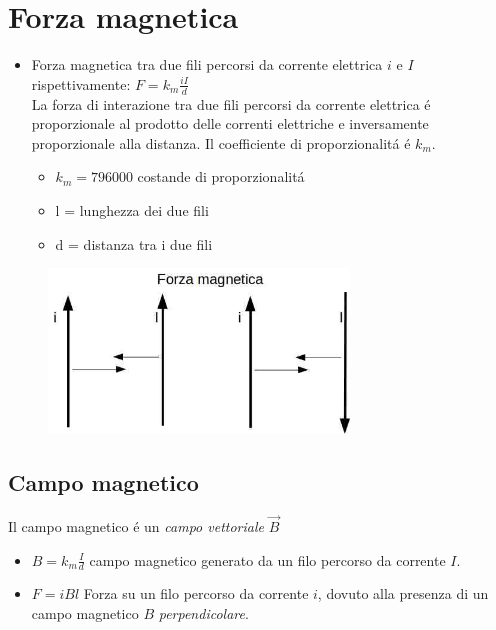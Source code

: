 \documentclass[17pt]{article}
\begin{document}
\section{Forza magnetica}

\begin{itemize}
	\item Forza magnetica tra due fili percorsi da corrente elettrica $i$ e $I$ rispettivamente: $F = k_m \frac{iI}{d}$\\
	La forza di interazione tra due fili percorsi da corrente elettrica \'e proporzionale al prodotto delle correnti elettriche e inversamente proporzionale alla distanza. Il coefficiente di proporzionalit\'a \'e $k_m$.
	\begin{itemize}
		\item $k_m = 796000$ costande di proporzionalit\'a
		\item l = lunghezza dei due fili
		\item d = distanza tra i due fili
	\end{itemize}
\end{itemize}


\begin{figure}[th]
\includegraphics[width=8cm]{forzaMagnetica.jpg}
\centering
\end{figure}


\subsection{Campo magnetico}
Il campo magnetico \'e un \emph{campo vettoriale} $\vec{B}$

\begin{itemize}
	\item $B = k_m \frac{I}{d}$ campo magnetico generato da un filo percorso da corrente $I$.
	\item $F = iBl$ Forza su un filo percorso da corrente $i$, dovuto alla presenza di un campo magnetico $B$ \emph{perpendicolare}.
\end{itemize}
\end{document}
